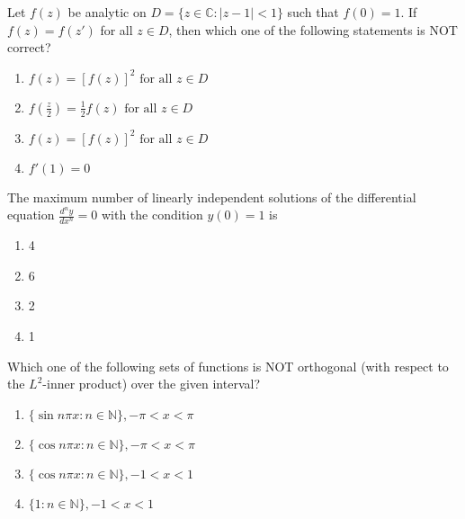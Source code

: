     \item Let $f(z)$ be analytic on $D = \{z \in \mathbb{C} : |z - 1| < 1\}$ such that $f(0) = 1$. If $f(z) = f(z')$ for all $z \in D$, then which one of the following statements is NOT correct?

    \begin{multicols}{4}
    \begin{enumerate}
        \item $f(z) = [f(z)]^2 \text{ for all } z \in D$
        \item $f\left(\frac{z}{2}\right) = \frac{1}{2} f(z) \text{ for all } z \in D$
        \item $f(z) = [f(z)]^2 \text{ for all } z \in D$
        \item $f'(1) = 0$
    \end{enumerate}
    \end{multicols}

    \item The maximum number of linearly independent solutions of the differential equation $\frac{d^n y}{dx^n} = 0$ with the condition $y(0) = 1$ is

    \begin{multicols}{4}
    \begin{enumerate}
        \item 4
        \item 6
        \item 2
        \item 1
    \end{enumerate}
    \end{multicols}

    \item Which one of the following sets of functions is NOT orthogonal (with respect to the $L^2$-inner product) over the given interval?

    \begin{multicols}{4}
    \begin{enumerate}
        \item $\{\sin n\pi x : n \in \mathbb{N}\}, -\pi < x < \pi$
        \item $\{\cos n\pi x : n \in \mathbb{N}\}, -\pi < x < \pi$
        \item $\{\cos n\pi x : n \in \mathbb{N}\}, -1 < x < 1$
        \item $\{1 : n \in \mathbb{N}\}, -1 < x < 1$
    \end{enumerate}
    \end{multicols}


